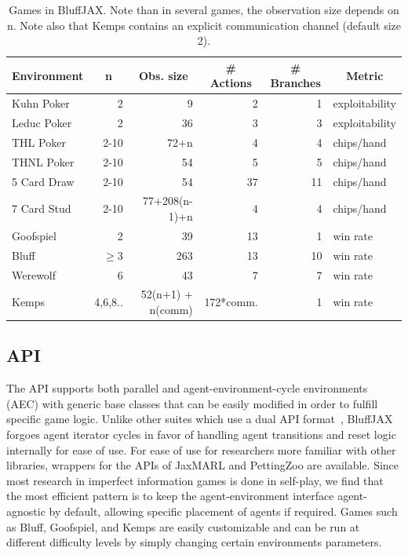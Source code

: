 \begin{table}[htbp]
    \caption{Games in BluffJAX. Note than in several games, the observation size depends on n. Note also that Kemps contains an explicit communication channel (default size 2).}
    \begin{center}
        \begin{tabular}{lrrrrl}
        \hline
            \multicolumn{1}{c}{Environment}  &\multicolumn{1}{c}{n}  &\multicolumn{1}{c}{Obs. size} &\multicolumn{1}{c}{\# Actions} &\multicolumn{1}{c}{\# Branches}  &\multicolumn{1}{c}{Metric} 
            \\ \hline
            Kuhn Poker & 2 & 9 & 2 & 1 & exploitability   \\
            Leduc Poker & 2 & 36 & 3 & 3 & exploitability  \\
            THL Poker & 2-10 & 72+n & 4 & 4 & chips/hand  \\
            THNL Poker & 2-10 & 54 & 5 & 5 & chips/hand  \\
            5 Card Draw  & 2-10 & 54 & 37 & 11 & chips/hand  \\
            7 Card Stud  & 2-10 & 77+208(n-1)+n & 4 & 4 & chips/hand  \\
            Goofspiel & 2 & 39 & 13 & 1 & win rate  \\
            Bluff & $\geq$3 & 263 & 13 & 10 & win rate  \\
            Werewolf & 6 & 43 & 7 & 7 & win rate  \\
            Kemps & 4,6,8.. & 52(n+1) + n(comm) & 172*comm. & 1 & win rate \\
            \hline
        \end{tabular}
    \end{center}
    \label{tab:games}
\end{table}

\subsection{API}
The API supports both parallel and agent-environment-cycle environments (AEC) with generic base classes that can be easily modified in order to fulfill specific game logic. Unlike other suites which use a dual API format~\citep{terry2021pettingzoo}, BluffJAX forgoes agent iterator cycles in favor of handling agent transitions and reset logic internally for ease of use. For ease of use for researchers more familiar with other libraries, wrappers for the APIs of JaxMARL and PettingZoo are available. Since most research in imperfect information games is done in self-play, we find that the most efficient pattern is to keep the agent-environment interface agent-agnostic by default, allowing specific placement of agents if required. Games such as Bluff, Goofspiel, and Kemps are easily customizable and can be run at different difficulty levels by simply changing certain environments parameters.

